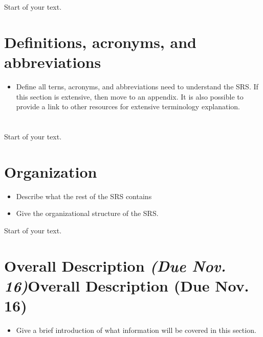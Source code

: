 \documentclass[12pt]{article}
\begin{document}
\section*{}\label{section}

Start of your text.

\section{Definitions, acronyms, and
abbreviations}\label{definitions-acronyms-and-abbreviations}

\begin{itemize}
\item
  Define all terns, acronyms, and abbreviations need to understand the
  SRS. If this section is extensive, then move to an appendix. It is
  also possible to provide a link to other resources for extensive
  terminology explanation.
\end{itemize}

\section*{}\label{section-1}

Start of your text.

\section{Organization}\label{organization}

\begin{itemize}
\item
  Describe what the rest of the SRS contains
\item
  Give the organizational structure of the SRS.
\end{itemize}

Start of your text.

\section{{Overall Description \emph{(Due Nov.
16)}}{Overall Description (Due Nov. 16)}}\label{overall-description-due-nov.-16}

\begin{itemize}
\item
  Give a brief introduction of what information will be covered in this
  section.
\end{itemize}
\end{document}
